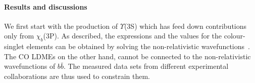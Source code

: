

\paragraph{Results and discussions}
\label{sec:results}
We first start with the production of $\Upsilon$(3S) which has feed down contributions
only from $\chi_{b}$(3P).
As described, the expressions and the values for the 
colour-singlet elements can be obtained by solving the non-relativistic 
wavefunctions~\cite{Cho:1995vh}. 
The CO LDMEs on the other hand, cannot be connected to the non-relativistic
wavefunctions of $b \bar b$. 
The measured data sets from different experimental collaborations are thus used to constrain them.

